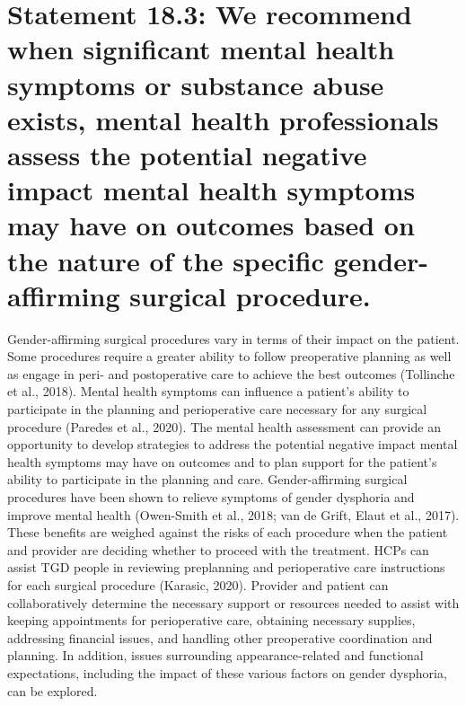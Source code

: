 \documentclass[
]{book}
\begin{document}
\hypertarget{statement-18.3-we-recommend-when-significant-mental-health-symptoms-or-substance-abuse-exists-mental-health-professionals-assess-the-potential-negative-impact-mental-health-symptoms-may-have-on-outcomes-based-on-the-nature-of-the-specific-gender-affirming-surgical-procedure.}{%
\section*{Statement 18.3: We recommend when significant mental health symptoms or substance abuse exists, mental health professionals assess the potential negative impact mental health symptoms may have on outcomes based on the nature of the specific gender-affirming surgical procedure.}\label{statement-18.3-we-recommend-when-significant-mental-health-symptoms-or-substance-abuse-exists-mental-health-professionals-assess-the-potential-negative-impact-mental-health-symptoms-may-have-on-outcomes-based-on-the-nature-of-the-specific-gender-affirming-surgical-procedure.}}

Gender-affirming surgical procedures vary in
terms of their impact on the patient. Some procedures require a greater ability to follow preoperative planning as well as engage in peri- and
postoperative care to achieve the best outcomes
(Tollinche et al., 2018). Mental health symptoms
can influence a patient's ability to participate in
the planning and perioperative care necessary for
any surgical procedure (Paredes et al., 2020). The
mental health assessment can provide an opportunity to develop strategies to address the potential negative impact mental health symptoms may
have on outcomes and to plan support for the
patient's ability to participate in the planning and
care. Gender-affirming surgical procedures have
been shown to relieve symptoms of gender dysphoria and improve mental health (Owen-Smith
et al., 2018; van de Grift, Elaut et al., 2017).
These benefits are weighed against the risks of
each procedure when the patient and provider
are deciding whether to proceed with the treatment. HCPs can assist TGD people in reviewing
preplanning and perioperative care instructions
for each surgical procedure (Karasic, 2020).
Provider and patient can collaboratively determine the necessary support or resources needed
to assist with keeping appointments for perioperative care, obtaining necessary supplies, addressing financial issues, and handling other
preoperative coordination and planning. In addition, issues surrounding appearance-related and
functional expectations, including the impact of
these various factors on gender dysphoria, can
be explored.
\end{document}
